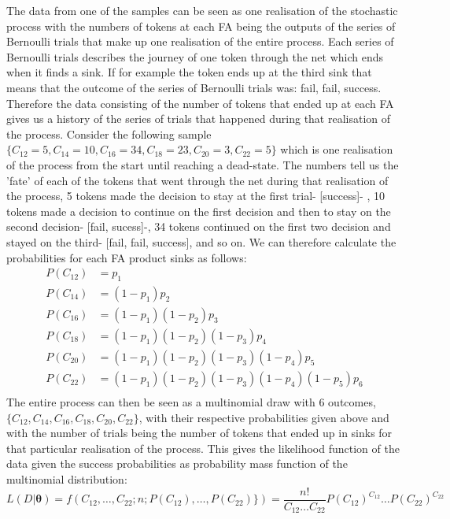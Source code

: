 The data from one of the samples can be seen as one realisation of the
stochastic process with the numbers of tokens at each FA being the
outputs of the series of Bernoulli trials that make up one realisation
of the entire process. Each series of Bernoulli trials describes the
journey of one token through the net which ends when it finds a
sink. If for example the token ends up at the third sink that means
that the outcome of the series of Bernoulli trials was: fail, fail,
success. Therefore the data consisting of the number of tokens that
ended up at each FA gives us a history of the series of trials that
happened during that realisation of the process. Consider the
following sample $\{C_{12}=5, C_{14}=10, C_{16}=34, C_{18}=23,
C_{20}=3, C_{22}=5\}$ which is one realisation of the process from
the start until reaching a dead-state. The numbers tell us the 'fate'
of each of the tokens that went through the net during that
realisation of the process, 5 tokens made the decision to stay at the
first trial- [success]- , 10 tokens made a decision to continue on the
first decision and then to stay on the second decision- [fail,
sucess]-, 34 tokens continued on the first two decision and stayed on
the third- [fail, fail, success], and so on. We can therefore calculate
the probabilities for each FA product sinks as follows:
\begin{align}
P(C_{12}) &= p_1 \nonumber\\
P(C_{14}) &= (1-p_1)p_2 \nonumber\\
P(C_{16}) &= (1-p_1)(1-p_2)p_3 \nonumber \\
P(C_{18}) &= (1-p_1)(1-p_2)(1-p_3)p_4 \nonumber\\
P(C_{20}) &= (1-p_1)(1-p_2)(1-p_3)(1-p_4)p_5 \nonumber\\
P(C_{22}) &= (1-p_1)(1-p_2)(1-p_3)(1-p_4)(1-p_5)p_6 \nonumber\\
\label{eq:param_cor}
\end{align}
The entire process can then be seen as a multinomial draw with 6
outcomes,  $\{C_{12}, C_{14}, C_{16}, C_{18}, C_{20}, C_{22}\}$, with
their respective probabilities given above and with the number of
trials being the number of tokens that ended up in sinks for that
particular realisation of the process. This gives the likelihood
function of the data given the success probabilities as
probability mass function of the multinomial distribution:
\begin{equation*}
L(D|\mathbf{\theta}) = f(C_{12},\dots, C_{22}; n ; P(C_{12}), \dots,
P(C_{22})\}) = \frac{n!}{C_{12}\dots C_{22}} P(C_{12})^{C_{12}}\dots P(C_{22})^{C_{22}}
\end{equation*}

